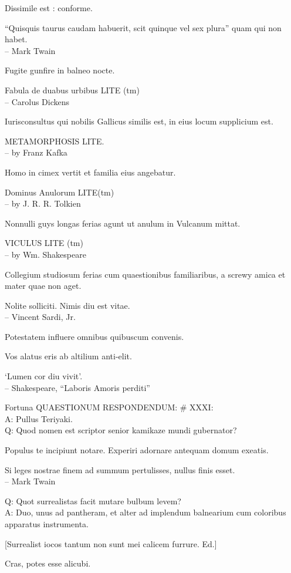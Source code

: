 \documentclass[titlepage,12pt]{memoir}
\begin{document}
Dissimile est : conforme.

“Quisquis taurus caudam habuerit, scit quinque vel sex plura”
quam qui non habet.
\\-- Mark Twain

Fugite gunfire in balneo nocte.

Fabula de duabus urbibus LITE (tm)
\\-- Carolus Dickens

Iurisconsultus qui nobilis Gallicus similis est, in eius locum supplicium est.

METAMORPHOSIS LITE.
\\-- by Franz Kafka

Homo in cimex vertit et familia eius angebatur.

Dominus Anulorum LITE(tm)
\\-- by J. R. R. Tolkien

Nonnulli guys longas ferias agunt ut anulum in Vulcanum mittat.

VICULUS LITE (tm)
\\-- by Wm. Shakespeare

Collegium studiosum ferias cum quaestionibus familiaribus, a screwy
amica et mater quae non aget.

Nolite solliciti. Nimis diu est vitae.
\\-- Vincent Sardi, Jr.

Potestatem influere omnibus quibuscum convenis.

Vos alatus eris ab altilium anti-elit.

‘Lumen cor diu vivit’.
\\-- Shakespeare, “Laboris Amoris perditi”

Fortuna QUAESTIONUM RESPONDENDUM: \# XXXI:\\
A: Pullus Teriyaki.
\\Q: Quod nomen est scriptor senior kamikaze mundi gubernator?

Populus te incipiunt notare. Experiri adornare antequam domum exeatis.

Si leges nostrae finem ad summum pertulisses, nullus finis esset.
\\-- Mark Twain

Q: Quot surrealistas facit mutare bulbum levem?\\
A: Duo, unus ad pantheram, et alter ad implendum balnearium
cum coloribus apparatus instrumenta.

[Surrealist iocos tantum non sunt mei calicem furrure. Ed.]

Cras, potes esse alicubi.
\end{document}
